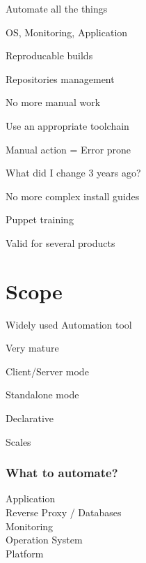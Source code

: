 \begin{iframe}[Automation]
\item Automate all the things
\item OS, Monitoring, Application
\item Reproducable builds
\item Repositories management
\end{iframe}

\begin{iframe}
\item No more manual work
\item Use an appropriate toolchain
\item Manual action = Error prone
\item What did I change 3 years ago?
\end{iframe}

\begin{iframe}[Documentation]
\item No more complex install guides
\item Puppet training
\item Valid for several products
\end{iframe}

\section{Scope}

\begin{iframe}[Puppet]
\item Widely used Automation tool\pause
\item Very mature\pause
\item Client/Server mode\pause
\item Standalone mode\pause
\item Declarative\pause
\item Scales
\end{iframe}

\begin{frame}
    \frametitle{What to automate?}
    \huge
    Application\\
    Reverse Proxy / Databases\\
    Monitoring\\
    Operation System\\
    Platform
\end{frame}

